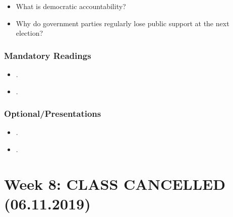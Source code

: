 \documentclass[abstract=on,parskip=full,headings=standardclasses,fontsize=11pt,paper=a4]{scrartcl}
\begin{document}
\begin{itemize}
\renewcommand\labelitemi{--}
\item What is democratic accountability?
\item Why do government parties  regularly lose public support at the next election?
\end{itemize}

\subsubsection*{Mandatory Readings}

\begin{itemize}
\item {}.
\item {}.
\end{itemize}


\subsubsection*{Optional/Presentations}
\begin{itemize}
\item {}.
\item {}.
\end{itemize}

 
 

\section{Week 8:  CLASS CANCELLED (06.11.2019)}
\end{document}

